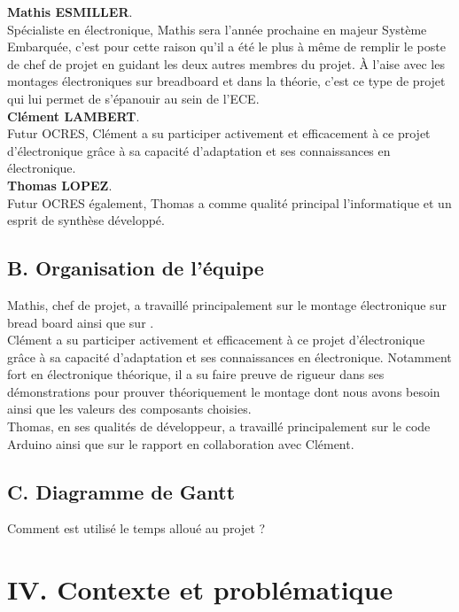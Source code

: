 \documentclass[a4paper,11pt]{book}
\begin{document}
\textbf{Mathis ESMILLER}.\\
Spécialiste en électronique, Mathis sera l'année prochaine en majeur Système Embarquée, c'est pour cette raison qu'il a été le plus à même de remplir le poste de chef de projet en guidant les deux autres membres du projet. À l'aise avec les montages électroniques sur breadboard et dans la théorie, c'est ce type de projet qui lui permet de s'épanouir au sein de l'ECE. \\

\textbf{Clément LAMBERT}.\\
Futur OCRES, Clément a su participer activement et efficacement à ce projet d'électronique grâce à sa capacité d'adaptation et ses connaissances en électronique. \\

\textbf{Thomas LOPEZ}.\\
Futur OCRES également, Thomas a comme qualité principal l'informatique et un esprit de synthèse développé. \\

\subsection*{B. Organisation de l'équipe}
Mathis, chef de projet, a travaillé principalement sur le montage électronique sur bread board ainsi que sur . \\

Clément a su participer activement et efficacement à ce projet d'électronique grâce à sa capacité d'adaptation et ses connaissances en électronique. Notamment fort en électronique théorique, il a su faire preuve de rigueur dans ses démonstrations pour prouver théoriquement le montage dont nous avons besoin ainsi que les valeurs des composants choisies.\\


Thomas, en ses qualités de développeur, a travaillé principalement sur le code Arduino ainsi que sur le rapport en collaboration avec Clément.\\

\subsection*{C. Diagramme de Gantt}
Comment est utilisé le temps alloué au projet ?

\newpage
\section*{IV. Contexte et problématique}
\end{document}
